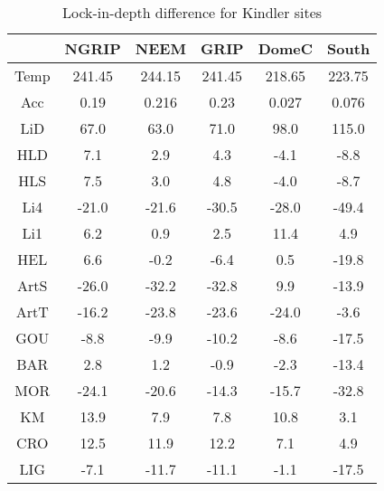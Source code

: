 \begin{table}[h]
\centering
\caption{Lock-in-depth difference for Kindler sites}
\label{table:5}
\begin{tabular}{cccccc}
\toprule
{} & {NGRIP} & {NEEM} & {GRIP} & {DomeC} & {South} \\
\midrule
Temp & 241.45 & 244.15 & 241.45 & 218.65 & 223.75 \\
Acc & 0.19 & 0.216 & 0.23 & 0.027 & 0.076 \\
LiD & 67.0 & 63.0 & 71.0 & 98.0 & 115.0 \\
HLD & 7.1 & 2.9 & 4.3 & -4.1 & -8.8 \\
HLS & 7.5 & 3.0 & 4.8 & -4.0 & -8.7 \\
Li4 & -21.0 & -21.6 & -30.5 & -28.0 & -49.4 \\
Li1 & 6.2 & 0.9 & 2.5 & 11.4 & 4.9 \\
HEL & 6.6 & -0.2 & -6.4 & 0.5 & -19.8 \\
ArtS & -26.0 & -32.2 & -32.8 & 9.9 & -13.9 \\
ArtT & -16.2 & -23.8 & -23.6 & -24.0 & -3.6 \\
GOU & -8.8 & -9.9 & -10.2 & -8.6 & -17.5 \\
BAR & 2.8 & 1.2 & -0.9 & -2.3 & -13.4 \\
MOR & -24.1 & -20.6 & -14.3 & -15.7 & -32.8 \\
KM & 13.9 & 7.9 & 7.8 & 10.8 & 3.1 \\
CRO & 12.5 & 11.9 & 12.2 & 7.1 & 4.9 \\
LIG & -7.1 & -11.7 & -11.1 & -1.1 & -17.5 \\
\bottomrule
\end{tabular}
\end{table}
